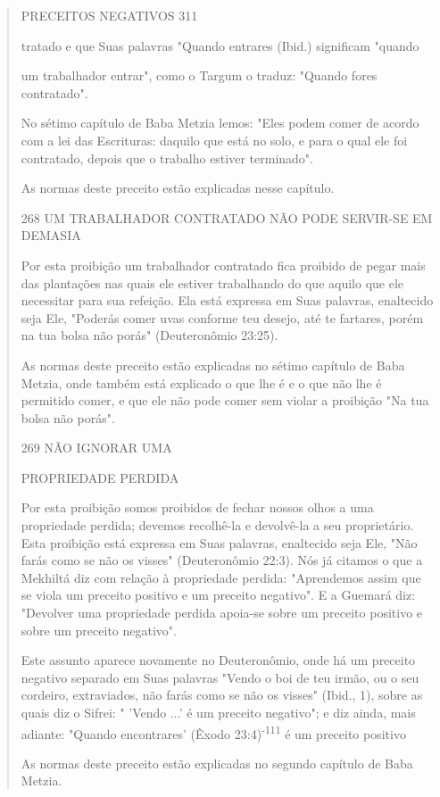 \begin{quote}
PRECEITOS NEGATIVOS 311

tratado e que Suas palavras "Quando entrares (Ibid.) significam "quando

um trabalhador entrar", como o Targum o traduz: "Quando fores
contratado".

No sétimo capítulo de Baba Metzia lemos: "Eles podem comer de acordo com
a lei das Escrituras: daquilo que está no solo, e para o qual ele foi
contratado, depois que o trabalho estiver terminado".

As normas deste preceito estão explicadas nesse capítulo.

268 UM TRABALHADOR CONTRATADO NÃO PODE SERVIR-SE EM DEMASIA

Por esta proibição um trabalhador contratado fica proibido de pe­gar
mais das plantações nas quais ele estiver trabalhando do que aquilo que
ele necessitar para sua refeição. Ela está expressa em Suas palavras,
enaltecido seja Ele, "Poderás comer uvas conforme teu desejo, até te
fartares, porém na tua bolsa não porás" (Deuteronômio 23:25).

As normas deste preceito estão explicadas no sétimo capítulo de Baba
Metzia, onde também está explicado o que lhe é e o que não lhe é
permitido comer, e que ele não pode comer sem violar a proibição "Na tua
bolsa não porás".

269 NÃO IGNORAR UMA

PROPRIEDADE PERDIDA

Por esta proibição somos proibidos de fechar nossos olhos a uma
propriedade perdida; devemos recolhê-la e devolvê-la a seu proprietário.
Esta proibição está expressa em Suas palavras, enaltecido seja Ele, "Não
farás co­mo se não os visses" (Deuteronômio 22:3). Nós já citamos o que
a Mekhiltá diz com relação à propriedade perdida: "Aprendemos assim que
se viola um preceito positivo e um preceito negativo". E a Guemará diz:
"Devolver uma propriedade perdida apoia-se sobre um preceito positivo e
sobre um preceito negativo".

Este assunto aparece novamente no Deuteronômio, onde há um pre­ceito
negativo separado em Suas palavras "Vendo o boi de teu irmão, ou o seu
cordeiro, extraviados, não farás como se não os visses" (Ibid., 1),
sobre as quais diz o Sifrei: " 'Vendo ...' é um preceito negativo"; e
diz ainda, mais adiante: "Quando encontrares' (Êxodo
23:4)\textsuperscript{-111} é um preceito positivo

As normas deste preceito estão explicadas no segundo capítulo de Baba
Metzia.


\end{quote}

